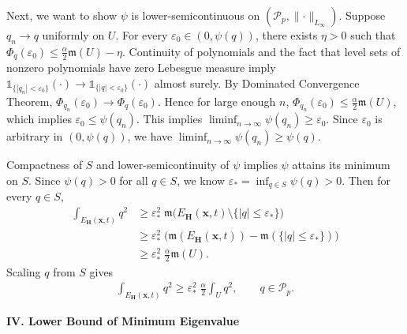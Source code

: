 \documentclass[10pt]{article}
\newcommand{\Indicator}{\mathds{1}}
\newcommand{\leb}{\mathfrak{m}}
\newcommand{\bH}{\mathbf{H}}
\newcommand{\bx}{\mathbf{x}}
\begin{document}
Next, we want to show $\psi$ is lower-semicontinuous on $(\mathcal{P}_{p}, \lVert \cdot \rVert_{L_{\infty}})$. Suppose $q_n \to q$ uniformly on $U$. For every $\varepsilon_0 \in (0, \psi(q))$, there exists $\eta > 0$ such that $\Phi_q(\varepsilon_0) \leq \frac{\alpha}{2} \leb(U) - \eta$. Continuity of polynomials and the fact that level sets of nonzero polynomials have zero Lebesgue measure imply $\Indicator_{\{|q_n| < \varepsilon_0\}}(\cdot) \to \Indicator_{\{|q| < \varepsilon_0\}}(\cdot)$ almost surely. By Dominated Convergence Theorem, $\Phi_{q_n}(\varepsilon_0) \to \Phi_q(\varepsilon_0)$. Hence for large enough $n$, $\Phi_{q_n}(\varepsilon_0) \leq \frac{\alpha}{2}\leb(U)$, which implies $\varepsilon_0 \leq \psi(q_n)$. This implies $\liminf_{n \to \infty} \psi(q_n) \geq \varepsilon_0$. Since $\varepsilon_0$ is arbitrary in $(0, \psi(q))$, we have $\liminf_{n \to \infty} \psi(q_n) \geq \psi(q)$.

Compactness of $S$ and lower-semicontinuity of $\psi$ implies $\psi$ attains its minimum on $S$. Since $\psi(q) > 0$ for all $q \in S$, we know $\varepsilon_* = \inf_{q \in S} \psi(q) > 0$. Then for every $q \in S$,
\begin{align*}
    \int_{E_{\bH}(\bx,t)} q^2
    & \geq \varepsilon_*^2 \; \leb \Big(E_{\bH}(\bx,t) \setminus \{|q| \leq \varepsilon_*\} \Big) \\
    & \geq \varepsilon_*^2 \; \Big(\leb(E_{\bH}(\bx,t)) - \leb(\{|q| \leq \varepsilon_*\}) \Big) \\
    & \geq \varepsilon_*^2 \; \frac{\alpha}{2} \leb(U).
\end{align*}
Scaling $q$ from $S$ gives
\begin{align}\label{sa-eq: integral relation}
    \int_{E_{\bH}(\bx,t)} q^2 \geq \varepsilon_*^2 \; \frac{\alpha}{2} \int_{U} q^2, \qquad q \in \mathcal{P}_{p}.
\end{align}

\begin{center}
\textbf{IV. Lower Bound of Minimum Eigenvalue}
\end{center}
\end{document}
